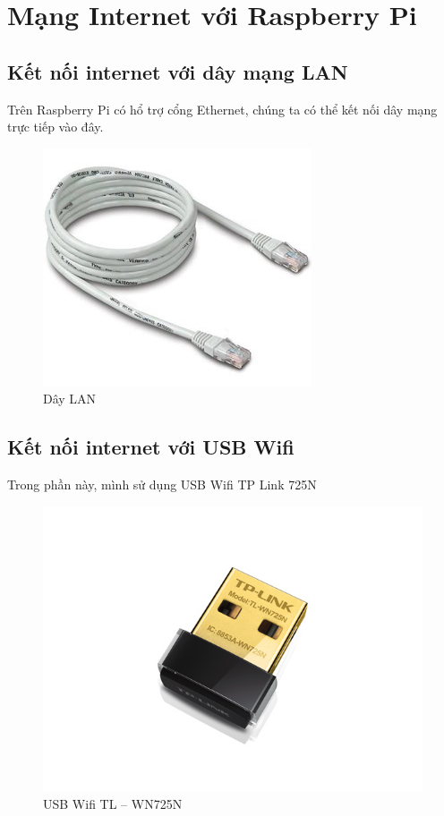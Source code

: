 \chapter{Mạng Internet với Raspberry Pi}
\section{Kết nối internet với dây mạng LAN}
Trên Raspberry Pi có hổ trợ cổng Ethernet, chúng ta có thể kết nối dây mạng trực tiếp vào đây.
\begin{figure}[!h]
\begin{center}
\includegraphics[scale=.4]{network/images/day-lan}
\end{center}
\caption{Dây LAN}
\end{figure}
\section{Kết nối internet với USB Wifi}
Trong phần này, mình sử dụng USB Wifi TP Link 725N
\begin{figure}[!h]
\begin{center}
\includegraphics[scale=.3]{network/images/TL-WN725N}
\end{center}
\caption{USB Wifi TL -- WN725N}
\end{figure}
